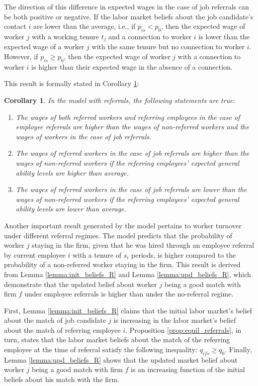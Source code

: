 \documentclass[12pt]{article}
\newtheorem{corollary}[theorem]{Corollary}
\begin{document}
The direction of this difference in expected wages in the case of job referrals can be both positive or negative. If the labor market beliefs about the job candidate's contact $i$ are lower than the average, i.e., if $p_{is} < p_{0}$, then the expected wage of worker $j$ with a working tenure $t_j$ and a connection to worker $i$ is lower than the expected wage of a worker $j$ with the same tenure but no connection to worker $i$. However, if $p_{is} \geq p_{0}$, then the expected wage of worker $j$ with a connection to worker $i$ is higher than their expected wage in the absence of a connection.

This result is formally stated in Corollary \ref{cor:referrals_wages}:
\begin{corollary}\label{cor:referrals_wages}
In the model with referrals, the following statements are true:
    \begin{enumerate}[label={\roman*})]
        \item The wages of both referred workers and referring employees in the case of employee referrals are higher than the wages of non-referred workers and the wages of workers in the case of job referrals.
        \item The wages of referred workers in the case of job referrals are higher than the wages of non-referred workers if the referring employees' expected general ability levels are higher than average.
        \item The wages of referred workers in the case of job referrals are lower than the wages of non-referred workers if the referring employees' expected general ability levels are lower than average.
    \end{enumerate}
\end{corollary}

Another important result generated by the model pertains to worker turnover under different referral regimes. The model predicts that the probability of worker $j$ staying in the firm, given that he was hired through an employee referral by current employee $i$ with a tenure of $s_i$ periods, is higher compared to the probability of a non-referred worker staying in the firm. This result is derived from Lemma \ref{lemma:init_beliefs_R} and Lemma \ref{lemma:upd_beliefs_R}, which demonstrate that the updated belief about worker $j$ being a good match with firm $f$ under employee referrals is higher than under the no-referral regime.

First, Lemma \ref{lemma:init_beliefs_R} claims that the initial labor market's belief about the match of job candidate $j$ is increasing in the labor market's belief about the match of referring employee $i$. Proposition \ref{prop:equil_referrals}, in turn, states that the labor market beliefs about the match of the referring employee at the time of referral satisfy the following inequality: $q_{ifs} \geq q_0$. Finally, Lemma \ref{lemma:upd_beliefs_R} shows that the updated market belief about worker $j$ being a good match with firm $f$ is an increasing function of the initial beliefs about his match with the firm.
\end{document}
